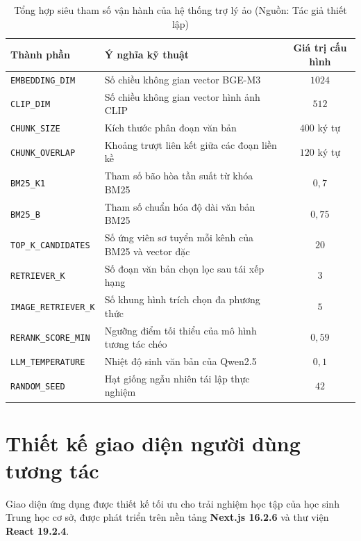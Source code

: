 \begin{table}[H]
\centering
\caption{Tổng hợp siêu tham số vận hành của hệ thống trợ lý ảo (Nguồn: Tác giả thiết lập)}
\label{tab:hyperparams}
\small
\begin{tabular}{lp{6.2cm}c}
\toprule
\textbf{Thành phần} & \textbf{Ý nghĩa kỹ thuật} & \textbf{Giá trị cấu hình} \\
\midrule
\texttt{EMBEDDING\_DIM} & Số chiều không gian vector BGE-M3 & $1024$ \\
\texttt{CLIP\_DIM} & Số chiều không gian vector hình ảnh CLIP & $512$ \\
\texttt{CHUNK\_SIZE} & Kích thước phân đoạn văn bản & $400$ ký tự \\
\texttt{CHUNK\_OVERLAP} & Khoảng trượt liên kết giữa các đoạn liền kề & $120$ ký tự \\
\texttt{BM25\_K1} & Tham số bão hòa tần suất từ khóa BM25 & $0{,}7$ \\
\texttt{BM25\_B} & Tham số chuẩn hóa độ dài văn bản BM25 & $0{,}75$ \\
\texttt{TOP\_K\_CANDIDATES} & Số ứng viên sơ tuyển mỗi kênh của BM25 và vector đặc & $20$ \\
\texttt{RETRIEVER\_K} & Số đoạn văn bản chọn lọc sau tái xếp hạng & $3$ \\
\texttt{IMAGE\_RETRIEVER\_K} & Số khung hình trích chọn đa phương thức & $5$ \\
\texttt{RERANK\_SCORE\_MIN} & Ngưỡng điểm tối thiểu của mô hình tương tác chéo & $0{,}59$ \\
\texttt{LLM\_TEMPERATURE} & Nhiệt độ sinh văn bản của Qwen2.5 & $0{,}1$ \\
\texttt{RANDOM\_SEED} & Hạt giống ngẫu nhiên tái lập thực nghiệm & $42$ \\
\bottomrule
\end{tabular}
\end{table}

\section{Thiết kế giao diện người dùng tương tác}
Giao diện ứng dụng được thiết kế tối ưu cho trải nghiệm học tập của học sinh Trung học cơ sở, được phát triển trên nền tảng \textbf{Next.js 16.2.6} và thư viện \textbf{React 19.2.4}.

